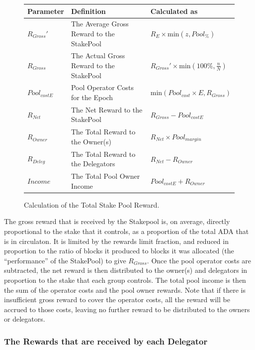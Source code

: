 \documentclass[11pt,a4paper,dvipsnames,twosided,final]{article}
\newcommand{\ada}{ADA{}}
\begin{document}
\begin{figure}[h!]
\begin{center}
\begin{tabular}{||l|p{6cm}|l||}
  \hline \hline
\textbf{Parameter}  & \textbf{Definition} & \textbf{Calculated as} \\\hline
$R_{Gross}'$ & The Average Gross Reward to the StakePool & $R_E \times \textrm{min} (z,{Pool}_\%)$ \\\hline
$R_{Gross}$ & The Actual Gross Reward to the StakePool & $R_{Gross}' \times \textrm{min} (100\%,\frac{n}{N})$ \\\hline
${Pool}_{costE}$ & Pool Operator Costs for the Epoch & $\textrm{min}(\textit{Pool}_{cost} \times E,R_{Gross})$ \\\hline
$R_{Net}$  & The Net Reward to the StakePool & $R_{Gross} - {Pool}_{costE}$ \\\hline
$R_{Owner}$ & The Total Reward to the Owner(s) & $R_{Net} \times {Pool}_{margin} $ \\\hline
$R_{Deleg}$ & The Total Reward to the Delegators & $R_{Net} - R_{Owner}$ \\\hline
$\textit{Income}$ & The Total Pool Owner Income & ${Pool}_{costE} + R_{Owner}$ \\\hline
\hline
\end{tabular}
\end{center}
\caption{Calculation of the Total Stake Pool Reward.}
\end{figure}

\noindent
The gross reward that is received by the Stakepool is, on average, directly proportional to the
stake that it controls, as a proportion of the total \ada{} that is in circulaton.
It is limited by the rewards limit fraction, and reduced in proportion to the ratio of blocks it produced
to blocks it was allocated (the ``performance'' of the StakePool) to give $R_{Gross}$.
Once the pool operator costs are subtracted,
the net reward is then distributed to the owner(s) and delegators in proportion to the
stake that each group controls.  The total pool income is then the sum of the operator costs and the pool owner rewards.
Note that if there is insufficient gross reward to cover the operator costs, all the reward will be accrued to those
costs, leaving no further reward to be distributed to the owners or delegators.

\subsubsection*{The Rewards that are received by each Delegator}
\end{document}
